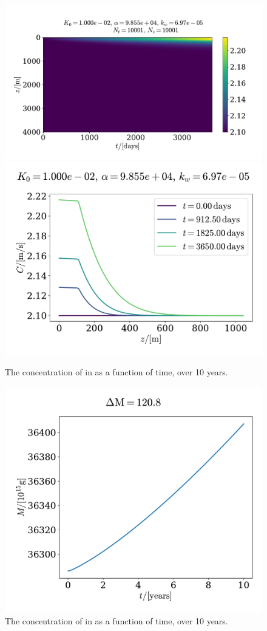 \documentclass{article}
\begin{document}
    \begin{figure}
        \centering
        \includegraphics[width=.60\textwidth]{../plots/prob3}
        \includegraphics[width=.39\textwidth]{../plots/prob3_i}
        \caption{The concentration of  in as a function of time, over 10 years.}
        \label{prob3}
    \end{figure}
    \begin{figure}
        \centering
        \includegraphics[width=.60\textwidth]{../plots/prob3_M}
        \caption{The concentration of  in as a function of time, over 10 years.}
        \label{prob3 mass}
    \end{figure}


    
       
\end{document}
